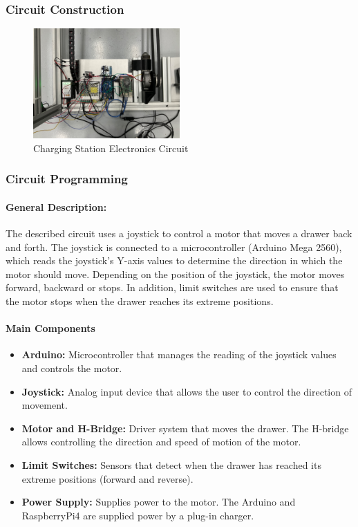     \subsubsection{Circuit Construction}
    \begin{figure}[H]
        \centering
        \includegraphics[width=0.5\textwidth]{pictures/station_electronics_circuit.jpeg}
        \caption{Charging Station Electronics Circuit}
        \label{fig:station_electronics_circuit}
    \end{figure}
    
    \subsubsection{Circuit Programming}
    
    \paragraph{\textbf{General Description:}}
    
    
    The described circuit uses a joystick to control a motor that moves a drawer back and forth. The joystick is connected to a microcontroller (Arduino Mega 2560), which reads the joystick's Y-axis values to determine the direction in which the motor should move. Depending on the position of the joystick, the motor moves forward, backward or stops. In addition, limit switches are used to ensure that the motor stops when the drawer reaches its extreme positions.
    
    
    
    \paragraph{\textbf{Main Components}
    }
    \begin{itemize}
        \item \textbf{Arduino:} Microcontroller that manages the reading of the joystick values and controls the motor.
        \item \textbf{Joystick:} Analog input device that allows the user to control the direction of movement.
        \item \textbf{Motor and H-Bridge:} Driver system that moves the drawer. The H-bridge allows controlling the direction and speed of motion of the motor.
        \item \textbf{Limit Switches:} Sensors that detect when the drawer has reached its extreme positions (forward and reverse).
        \item \textbf{Power Supply:} Supplies power to the motor. The Arduino and RaspberryPi4 are supplied power by a plug-in charger.
    \end{itemize}
    
